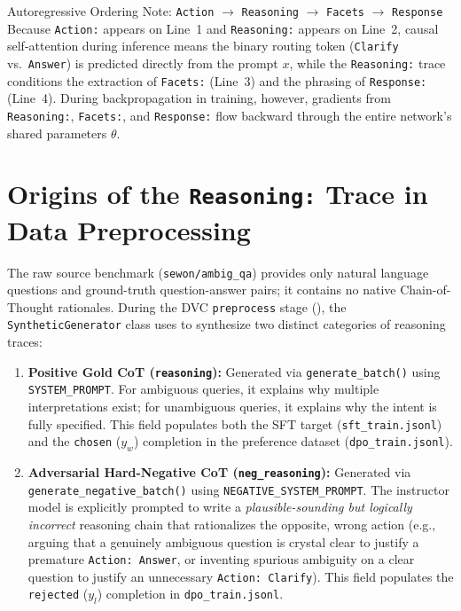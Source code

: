 \documentclass[10pt,letterpaper]{article}
\begin{document}
\begin{techcallout}{Autoregressive Ordering Note: \texttt{Action} $\rightarrow$ \texttt{Reasoning} $\rightarrow$ \texttt{Facets} $\rightarrow$ \texttt{Response}}
Because \texttt{Action:} appears on Line~1 and \texttt{Reasoning:} appears on Line~2, causal self-attention during inference means the binary routing token (\texttt{Clarify} vs.\ \texttt{Answer}) is predicted directly from the prompt $x$, while the \texttt{Reasoning:} trace conditions the extraction of \texttt{Facets:} (Line~3) and the phrasing of \texttt{Response:} (Line~4). During backpropagation in training, however, gradients from \texttt{Reasoning:}, \texttt{Facets:}, and \texttt{Response:} flow backward through the entire network's shared parameters $\theta$.
\end{techcallout}

\section{Origins of the \texttt{Reasoning:} Trace in Data Preprocessing}

The raw source benchmark (\texttt{sewon/ambig\_qa}) provides only natural language questions and ground-truth question-answer pairs; it contains no native Chain-of-Thought rationales. During the DVC \texttt{preprocess} stage (), the \texttt{SyntheticGenerator} class uses  to synthesize two distinct categories of reasoning traces:

\begin{enumerate}[leftmargin=18pt, itemsep=4pt]
    \item \textbf{Positive Gold CoT (\texttt{reasoning}):} Generated via \texttt{generate\_batch()} using \texttt{SYSTEM\_PROMPT}. For ambiguous queries, it explains why multiple interpretations exist; for unambiguous queries, it explains why the intent is fully specified. This field populates both the SFT target (\texttt{sft\_train.jsonl}) and the \texttt{chosen} ($y_w$) completion in the preference dataset (\texttt{dpo\_train.jsonl}).
    \item \textbf{Adversarial Hard-Negative CoT (\texttt{neg\_reasoning}):} Generated via \texttt{generate\_negative\_batch()} using \texttt{NEGATIVE\_SYSTEM\_PROMPT}. The instructor model is explicitly prompted to write a \textit{plausible-sounding but logically incorrect} reasoning chain that rationalizes the opposite, wrong action (e.g., arguing that a genuinely ambiguous question is crystal clear to justify a premature \texttt{Action: Answer}, or inventing spurious ambiguity on a clear question to justify an unnecessary \texttt{Action: Clarify}). This field populates the \texttt{rejected} ($y_l$) completion in \texttt{dpo\_train.jsonl}.
\end{enumerate}
\end{document}
